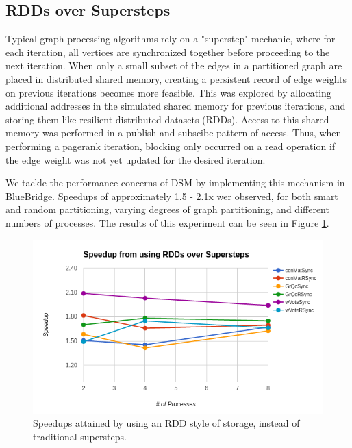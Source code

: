 \subsection{RDDs over Supersteps}

Typical graph processing algorithms rely on a "superstep" mechanic, where for
each iteration, all vertices are synchronized together before proceeding to the
next iteration. When only a small subset of the edges in a partitioned graph 
are placed in distributed shared memory, creating a persistent record of edge
weights on previous iterations becomes more feasible. This was explored by
allocating additional addresses in the simulated shared memory for previous 
iterations, and storing them like resilient distributed datasets (RDDs). Access
to this shared memory was performed in a publish and subscibe pattern of access.
Thus, when performing a pagerank iteration, blocking only occurred on a read
operation if the edge weight was not yet updated for the desired iteration.

We tackle the performance concerns of DSM by implementing this mechanism
in BlueBridge. Speedups of approximately 1.5 - 2.1x wer observed, for both smart
and random partitioning, varying degrees of graph partitioning, and different
numbers of processes. The results of this experiment can be seen in Figure
\ref{fig:rdds}.

\begin{figure}[h]
\includegraphics[width=\linewidth]{"fig/rdd_vs_ss"}
\caption{Speedups attained by using an RDD style of storage, instead of
 traditional supersteps.}
\label{fig:rdds}
\end{figure}